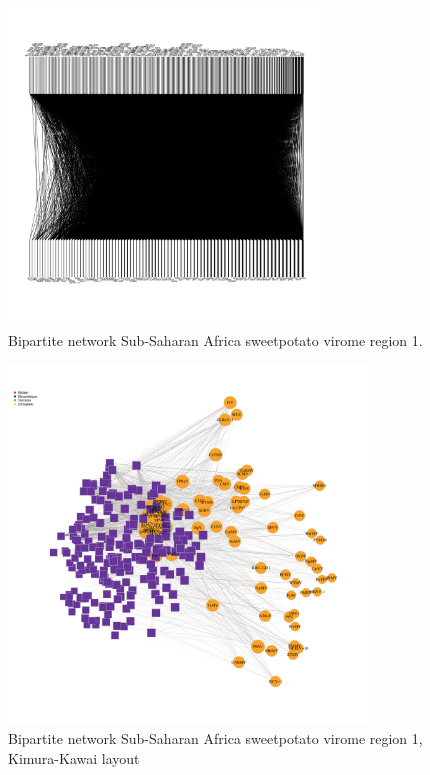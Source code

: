 \documentclass{article}
\begin{document}
\begin{figure}[h!]
\begin{center}
\includegraphics[width=0.75\textwidth]{../results/k-cluster4/4-kcluster_bipartitenetwork_Feb28.pdf
} %
\caption{Bipartite network Sub-Saharan Africa sweetpotato virome region 1.}
\end{center}
\end{figure}



\begin{figure}[h!]
\begin{center}
\includegraphics[width=0.85\textwidth]{../results/k-cluster4/4-kcluster_bipartitenetwork-kk_Feb28.pdf
} %
\caption{Bipartite network Sub-Saharan Africa sweetpotato virome region 1, Kimura-Kawai layout}
\end{center}
\end{figure}
\end{document}
